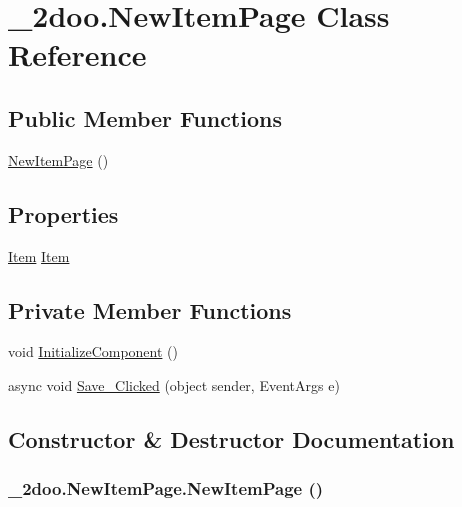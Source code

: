 \hypertarget{class__2doo_1_1_new_item_page}{
\section{\_\-2doo.NewItemPage Class Reference}
\label{class__2doo_1_1_new_item_page}
}
\subsection*{Public Member Functions}
\begin{CompactItemize}
\item 
\hyperlink{class__2doo_1_1_new_item_page_7a2eda6b6fce64750fba48d347ca503a}{NewItemPage} ()
\end{CompactItemize}
\subsection*{Properties}
\begin{CompactItemize}
\item 
\hyperlink{class__2doo_1_1_item}{Item} \hyperlink{class__2doo_1_1_new_item_page_f2d7a5ff4bb1bf0a26edfc60c1d2b5d0}{Item}
\end{CompactItemize}
\subsection*{Private Member Functions}
\begin{CompactItemize}
\item 
void \hyperlink{class__2doo_1_1_new_item_page_6aa87c4d56fd5df38bb8ccb2881d72c4}{InitializeComponent} ()
\item 
async void \hyperlink{class__2doo_1_1_new_item_page_52ecee4a105f3d4bba6802b55714b0bc}{Save\_\-Clicked} (object sender, EventArgs e)
\end{CompactItemize}


\subsection{Constructor \& Destructor Documentation}
\hypertarget{class__2doo_1_1_new_item_page_7a2eda6b6fce64750fba48d347ca503a}{
\subsubsection[{NewItemPage}]{\setlength{\rightskip}{0pt plus 5cm}\_\-2doo.NewItemPage.NewItemPage ()}}
\label{class__2doo_1_1_new_item_page_7a2eda6b6fce64750fba48d347ca503a}





